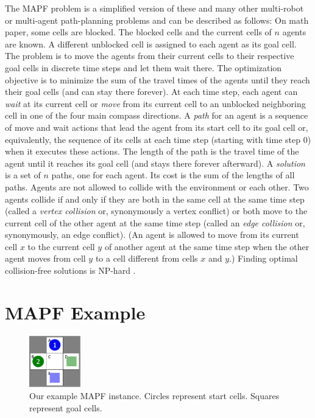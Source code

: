 \documentclass[11pt]{article}
\begin{document}
The MAPF problem is a simplified version of these and many other multi-robot or multi-agent path-planning problems and can be described as follows: On math paper, some cells are blocked. The blocked cells and the current cells of $n$ agents are known. A different unblocked cell is assigned to each agent as its goal cell. The problem is to move the agents from their current cells to their respective goal cells in discrete time steps and let them wait there. The optimization objective is to minimize the sum of the travel times of the agents until they reach their goal cells (and can stay there forever). At each time step, each agent can \emph{wait} at its current cell or \emph{move} from its current cell to an unblocked neighboring cell in one of the four main compass directions. A \emph{path} for an agent is a sequence of move and wait actions that lead the agent from its start cell to its goal cell or, equivalently, the sequence of its cells at each time step (starting with time step 0) when it executes these actions. The length of the path is the travel time of the agent until it reaches its goal cell (and stays there forever afterward). A \emph{solution} is a set of $n$ paths, one for each agent. Its cost is the sum of the lengths of all paths. Agents are not allowed to collide with the environment or each other. Two agents collide if and only if they are both in the same cell at the same time step (called a \emph{vertex collision} or, synonymously a vertex conflict) or both move to the current cell of the other agent at the same time step (called an \emph{edge collision} or, synonymously, an edge conflict).  (An agent is allowed to move from its current cell $x$ to the current cell $y$ of another agent at the same time step when the other agent moves from cell $y$ to a cell different from cells $x$ and $y$.) Finding optimal collision-free solutions is NP-hard \cite{Yu13}.

\section{MAPF Example}

\begin{figure}[ht]
\centering
\includegraphics[width=0.2\textwidth]{images/example.png}
\caption{Our example MAPF instance. Circles represent start cells. Squares represent goal cells. \label{example}}
\end{figure}
\end{document}
